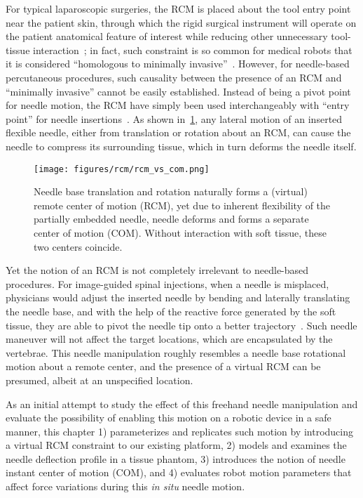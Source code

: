 For typical laparoscopic surgeries, the RCM is placed about the tool entry point near the patient skin, through which the rigid surgical instrument will operate on the patient anatomical feature of interest while reducing other unnecessary tool-tissue interaction~\parencite{kuoRoboticsMinimallyInvasive2009}; in fact, such constraint is so common for medical robots that it is considered ``homologous to minimally invasive''~\parencite{stoianoviciMultiImagerCompatibleMR2018}. However, for needle-based percutaneous procedures, such causality between the presence of an RCM and ``minimally invasive'' cannot be easily established. Instead of being a pivot point for needle motion, the RCM have simply been used interchangeably with ``entry point'' for needle insertions~\parencite{bassanNovelManipulatorPercutaneous2009,xiaoPortableBodyAttachedPositioning2020,stoianoviciMultiImagerCompatibleMR2018,zhangModelingDesignExperiment2018}. As shown in~\cref{fig:rcm-vs-com}, any lateral motion of an inserted flexible needle, either from translation or rotation about an RCM, can cause the needle to compress its surrounding tissue, which in turn deforms the needle itself.

\begin{figure}[tb]
  \centering
  \texttt{[image: figures/rcm/rcm\_vs\_com.png]}
  \caption{Needle base translation and rotation naturally forms a (virtual) remote center of motion (RCM), yet due to inherent flexibility of the partially embedded needle, needle deforms and forms a separate center of motion (COM). Without interaction with soft tissue, these two centers coincide.}
  \label{fig:rcm-vs-com}
\end{figure}

Yet the notion of an RCM is not completely irrelevant to needle-based procedures. For image-guided spinal injections, when a needle is misplaced, physicians would adjust the inserted needle by bending and laterally translating the needle base, and with the help of the reactive force generated by the soft tissue, they are able to pivot the needle tip onto a better trajectory~\parencite{fritzAugmentedRealityVisualization2012}. Such needle maneuver will not affect the target locations, which are encapsulated by the vertebrae. This needle manipulation roughly resembles a needle base rotational motion about a remote center, and the presence of a virtual RCM can be presumed, albeit at an unspecified location.

As an initial attempt to study the effect of this freehand needle manipulation and evaluate the possibility of enabling this motion on a robotic device in a safe manner, this chapter 1) parameterizes and replicates such motion by introducing a virtual RCM constraint to our existing platform, 2) models and examines the needle deflection profile in a tissue phantom, 3) introduces the notion of needle instant center of motion (COM), and 4) evaluates robot motion parameters that affect force variations during this \textit{in situ} needle motion.

